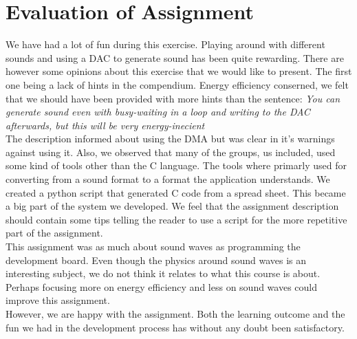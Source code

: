 \section{Evaluation of Assignment}
We have had a lot of fun during this exercise. Playing around with different sounds and using a DAC to generate sound has been quite rewarding. There are however some opinions about this exercise that we would like to present. The first one being a lack of hints in the compendium. Energy efficiency conserned, we felt that we should have been provided with more hints than the sentence:
\emph{You can generate sound even with busy-waiting in a loop and writing to the DAC afterwards, but this will be very energy-inecient}\\
The description informed about using the DMA but was clear in it's warnings against using it. Also, we observed that many of the groups, us included, used some kind of tools other than the C language. The tools where primarly used for converting from a sound format to a format the application understands. We created a python script that generated C code from a spread sheet. This became a big part of the system we developed. We feel that the assignment description should contain some tips telling the reader to use a script for the more repetitive part of the assignment.\\
This assignment was as much about sound waves as programming the development board. Even though the physics around sound waves is an interesting subject, we do not think it relates to what this course is about. Perhaps focusing more on energy efficiency and less on sound waves could improve this assignment. \\
However, we are happy with the assignment. Both the learning outcome and the fun we had in the development process has without any doubt been satisfactory.
